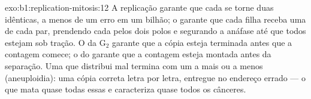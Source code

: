 \begin{solution}{exo:b1:replication-mitosis:12}
A replicação garante que cada  se torne duas 
idênticas, a menos de um erro em um bilhão; o  garante que cada
filha receba uma de cada par, prendendo cada  pelos dois polos
e segurando a anáfase até que todos estejam sob tração. O  da G$_2$ garante que a cópia esteja terminada antes que a
contagem comece; o  do  garante que a contagem
esteja montada antes da separação. Uma  que distribui mal termina
com um  a mais ou a menos (aneuploidia): uma cópia correta
letra por letra, entregue no endereço errado --- o que mata quase todas
essas  e caracteriza quase todos os cânceres.
\end{solution}

